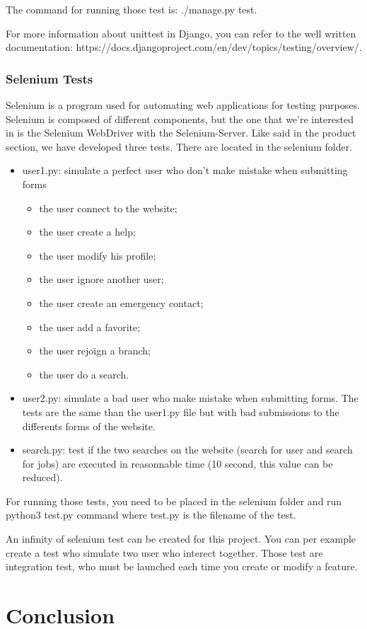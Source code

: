 \documentclass[11pt, a4paper]{article}      %
\begin{document}
The command for running those test is: ./manage.py test.

For more information about unittest in Django, you can refer to the well written documentation: https://docs.djangoproject.com/en/dev/topics/testing/overview/.


\subsubsection{Selenium Tests}


Selenium is a program used for automating web applications for testing purposes. Selenium is composed of different components, but the one that we’re interested in is the Selenium WebDriver with the Selenium-Server. Like said in the product section, we have developed three tests. There are located in the selenium folder.

\begin{itemize}
\item user1.py: simulate a perfect user who don't make mistake when submitting forms
\begin{itemize}
    \item the user connect to the website;
    \item the user create a help;
    \item the user modify his profile;
    \item the user ignore another user;
    \item the user create an emergency contact;
    \item the user add a favorite;
    \item the user rejoign a branch;
    \item the user do a search.
\end{itemize}
\item user2.py: simulate a bad user who make mistake when submitting forms. The tests are the same than the user1.py file but with bad submissions to the differents forms of the website.
\item search.py: test if the two searches on the website (search for user and search for jobs) are executed in reasonnable time (10 second, this value can be reduced).
\end{itemize}

For running those tests, you need to be placed in the selenium folder and run python3 test.py command where test.py is the filename of the test.

An infinity of selenium test can be created for this project. You can per example create a test who simulate two user who interect together. Those test are integration test, who must be launched each time you create or modify a feature.



\section{Conclusion}
\end{document}

